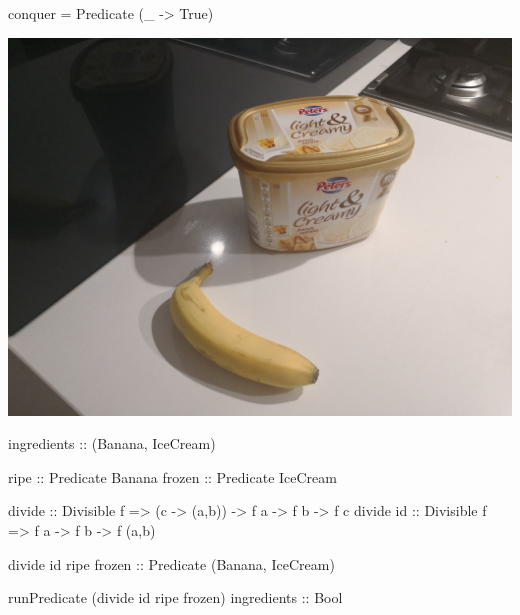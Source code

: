 \documentclass[UKenglish,usenames,dvipsnames,svgnames,table,aspectratio=169,mathserif]{beamer}
\newcommand{\nl}{\vspace{\baselineskip}}
\newcommand{\pnl}{\pause \nl}
\begin{document}
\begin{frame}[fragile]
\begin{overlayarea}{\textwidth}{0.2\textheight}
\begin{onlyenv}
\begin{haskellcode}
  conquer = Predicate (\_ -> True)
\end{haskellcode}
\end{onlyenv}
\end{overlayarea}
\end{frame}


\begin{frame}
\centering
\includegraphics[scale=0.09]{images/banana1.jpg}
\end{frame}


\begin{frame}[fragile]

\begin{haskellcode}
ingredients :: (Banana, IceCream)
\end{haskellcode}

\pnl
\begin{haskellcode}
ripe :: Predicate Banana
frozen :: Predicate IceCream
\end{haskellcode}

\pnl
\begin{haskellcode}
divide    :: Divisible f => (c -> (a,b)) -> f a -> f b -> f c
divide id :: Divisible f =>                 f a -> f b -> f (a,b)
\end{haskellcode}

\pnl
\begin{haskellcode}
divide id ripe frozen :: Predicate (Banana, IceCream)
\end{haskellcode}

\pnl
\begin{haskellcode}
runPredicate (divide id ripe frozen) ingredients :: Bool
\end{haskellcode}
\end{frame}
\end{document}
